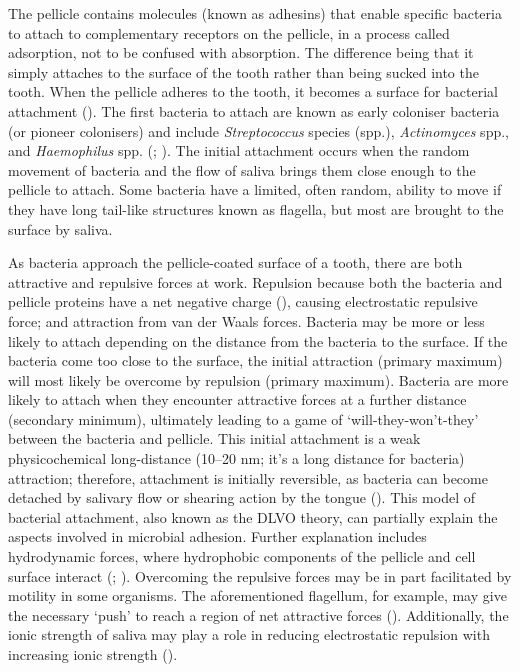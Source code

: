 \documentclass[
  b5paper,
]{book}
\begin{document}
The pellicle contains molecules (known as adhesins) that enable specific
bacteria to attach to complementary receptors on the pellicle, in a
process called adsorption, not to be confused with absorption. The
difference being that it simply attaches to the surface of the tooth
rather than being sucked into the tooth. When the pellicle adheres to
the tooth, it becomes a surface for bacterial attachment
(). The
first bacteria to attach are known as early coloniser bacteria (or
pioneer colonisers) and include \emph{Streptococcus} species (spp.),
\emph{Actinomyces} spp., and \emph{Haemophilus} spp.
(;
). The
initial attachment occurs when the random movement of bacteria and the
flow of saliva brings them close enough to the pellicle to attach. Some
bacteria have a limited, often random, ability to move if they have long
tail-like structures known as flagella, but most are brought to the
surface by saliva.

As bacteria approach the pellicle-coated surface of a tooth, there are
both attractive and repulsive forces at work. Repulsion because both the
bacteria and pellicle proteins have a net negative charge
(), causing
electrostatic repulsive force; and attraction from van der Waals forces.
Bacteria may be more or less likely to attach depending on the distance
from the bacteria to the surface. If the bacteria come too close to the
surface, the initial attraction (primary maximum) will most likely be
overcome by repulsion (primary maximum). Bacteria are more likely to
attach when they encounter attractive forces at a further distance
(secondary minimum), ultimately leading to a game of
`will-they-won't-they' between the bacteria and pellicle. This initial
attachment is a weak physicochemical long-distance (10--20 nm; it's a
long distance for bacteria) attraction; therefore, attachment is
initially reversible, as bacteria can become detached by salivary flow
or shearing action by the tongue
(). This model
of bacterial attachment, also known as the DLVO theory, can partially
explain the aspects involved in microbial adhesion. Further explanation
includes hydrodynamic forces, where hydrophobic components of the
pellicle and cell surface interact
(;
).
Overcoming the repulsive forces may be in part facilitated by motility
in some organisms. The aforementioned flagellum, for example, may give
the necessary `push' to reach a region of net attractive forces
().
Additionally, the ionic strength of saliva may play a role in reducing
electrostatic repulsion with increasing ionic strength
().
\end{document}

